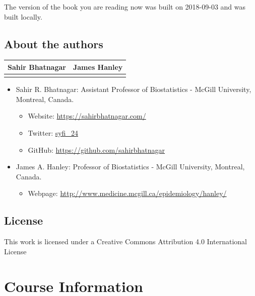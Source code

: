 \documentclass[]{book}
\providecommand{\tightlist}{%
  \setlength{\itemsep}{0pt}\setlength{\parskip}{0pt}}
\providecommand{\tightlist}{%
  \setlength{\itemsep}{0pt}\setlength{\parskip}{0pt}}
\theoremstyle{definition}
\theoremstyle{definition}
\theoremstyle{definition}
\theoremstyle{remark}
\begin{document}
The version of the book you are reading now was built on 2018-09-03 and
was built locally.

\section*{About the authors}\label{about-the-authors}

\begin{longtable}[]{@{}cc@{}}
\toprule
Sahir Bhatnagar & James Hanley\tabularnewline
\midrule
\endhead
&\tabularnewline
\bottomrule
\end{longtable}

\begin{itemize}
\tightlist
\item
  Sahir R. Bhatnagar: Assistant Professor of Biostatistics - McGill
  University, Montreal, Canada.

  \begin{itemize}
  \tightlist
  \item
    Website: \url{https://sahirbhatnagar.com/}\\
  \item
    Twitter: \href{https://twitter.com/syfi_24}{syfi\_24}\\
  \item
    GitHub: \url{https://github.com/sahirbhatnagar}\\
  \end{itemize}
\item
  James A. Hanley: Professor of Biostatistics - McGill University,
  Montreal, Canada.

  \begin{itemize}
  \tightlist
  \item
    Webpage: \url{http://www.medicine.mcgill.ca/epidemiology/hanley/}
  \end{itemize}
\end{itemize}

\section*{License}\label{license}

This work is licensed under a Creative Commons Attribution 4.0
International License

\chapter*{Course Information}\label{course-information}
\end{document}
